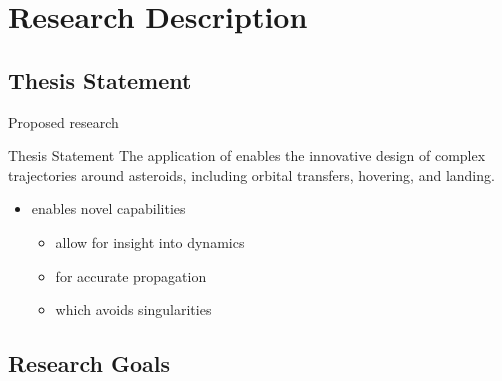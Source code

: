 
\section[Problem Description]{Research Description}
\subsection[Thesis]{Thesis Statement}

\begin{frame}[t]{Proposed research}
    \begin{block}{Thesis Statement}
        The application of  enables the innovative design of complex trajectories around asteroids, including orbital transfers, hovering, and landing.
    \end{block}
    \pause
    \begin{itemize}
        \item {} enables novel capabilities
        \begin{itemize}     
            \item {} allow for insight into dynamics
            \item {} for accurate propagation
            \item {} which avoids singularities
        \end{itemize}
    \end{itemize}

\end{frame}

\subsection[Research Goals]{Research Goals}

